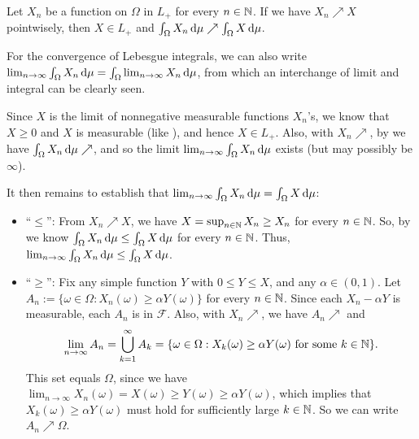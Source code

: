 \begin{enumerate}
\begin{theorem}
\label{thm:mct}
Let \(X_n\) be a function on \(\Omega\) in \(L_{+}\) for every \(n\in\mathbb{N}\). If
we have \(X_n\nearrow X\) pointwisely, then \(X\in L_{+}\) and
\(\int_{\Omega}^{}X_n\odif{\mu}\nearrow\int_{\Omega}^{}X\odif{\mu}\).
\end{theorem}
\begin{note}
For the convergence of Lebesgue integrals, we can also write
\(\lim_{n\to\infty}\int_{\Omega}^{}X_n\odif{\mu}=\int_{\Omega}^{}\lim_{n\to\infty}X_n\odif{\mu}\),
from which an interchange of limit and integral can be clearly seen.
\end{note}

\begin{pf}
Since \(X\) is the limit of nonnegative measurable functions \(X_n\)'s, we know
that \(X\ge 0\) and \(X\) is measurable (like
), and hence \(X\in L_{+}\). Also, with \(X_n\nearrow\),
by  we have
\(\int_{\Omega}^{}X_n\odif{\mu}\nearrow\), and so the limit
\(\lim_{n\to \infty}\int_{\Omega}^{}X_n\odif{\mu}\) exists (but may possibly be
\(\infty\)).

It then remains to establish that \(\lim_{n\to
\infty}\int_{\Omega}^{}X_n\odif{\mu}=\int_{\Omega}^{}X\odif{\mu}\):
\begin{itemize}
\item ``\(\le\)'': From \(X_n\nearrow X\), we have \(X=\sup_{n\in\mathbb{N}}X_n\ge
X_n\) for every \(n\in\mathbb{N}\). So, by  we know
\(\int_{\Omega}^{}X_n\odif{\mu}\le\int_{\Omega}^{}X\odif{\mu}\) for every
\(n\in\mathbb{N}\). Thus, \(\lim_{n\to \infty}\int_{\Omega}^{}X_n\odif{\mu} \le
\int_{\Omega}^{}X\odif{\mu}\).
\item ``\(\ge\)'': Fix any simple function \(Y\) with \(0\le Y\le X\), and any
\(\alpha\in(0,1)\). Let \(A_n:=\{\omega\in\Omega:X_n(\omega)\ge \alpha
Y(\omega)\}\) for every \(n\in\mathbb{N}\). Since each \(X_n-\alpha Y\) is measurable,
each \(A_n\) is in \(\mathcal{F}\). Also, with \(X_n\nearrow\), we have
\(A_n\nearrow\) and
\[
\lim_{n\to\infty}A_n=\bigcup_{k=1}^{\infty}A_k
=\{\omega\in\Omega:X_k(\omega)\ge \alpha Y(\omega)\text{ for some \(k\in\mathbb{N}\)}\}.
\]
This set equals \(\Omega\), since we have \(\lim_{n\to\infty}X_n(\omega)=X(\omega)\ge
Y(\omega)\ge \alpha Y(\omega)\), which implies that \(X_k(\omega)\ge \alpha
Y(\omega)\) must hold for sufficiently large \(k\in\mathbb{N}\). So we can write
\(A_n\nearrow \Omega\).


\end{itemize}
\end{pf}
\end{enumerate}
